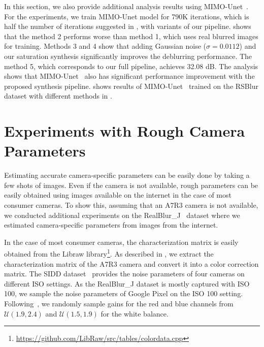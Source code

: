 In this section, we also provide additional analysis results using MIMO-Unet~\cite{Cho_2021_ICCV}. For the experiments, we train MIMO-Unet model for 790K iterations, which is half the number of iterations suggested in \cite{Cho_2021_ICCV}, with variants of our pipeline.
 shows that the method 2 performs worse than method 1, which uses real blurred images for training.
Methods 3 and 4 show that adding Gaussian noise ($\sigma=0.0112$) and our saturation synthesis significantly improves the deblurring performance.
The method 5, which corresponds to our full pipeline, achieves 32.08 dB.
The analysis shows that MIMO-Unet~\cite{Cho_2021_ICCV} also has significant performance improvement with the proposed synthesis pipeline.
 shows results of MIMO-Unet~\cite{Cho_2021_ICCV} trained on the RSBlur dataset with different methods in .

\section{Experiments with Rough Camera Parameters}

Estimating accurate camera-specific parameters can be easily done by taking a few shots of images.
Even if the camera is not available, rough parameters can be easily obtained using images available on the internet in the case of most consumer cameras.
To show this, assuming that an A7R3 camera is not available, we conducted additional experiments on the RealBlur\_J~\cite{jsrim-ECCV2020} dataset where we estimated camera-specific parameters from images from the internet.

In the case of most consumer cameras, the characterization matrix is easily obtained from the Libraw library\footnote{\href{https://github.com/LibRaw/LibRaw/blob/2a9a4de21ea7f5d15314da8ee5f27feebf239655/src/tables/colordata.cpp}{https://github.com/LibRaw/src/tables/colordata.cpp}}. As described in , we extract the characterization matrix of the A7R3 camera and convert it into a color correction matrix.
The SIDD dataset~\cite{Abdelhamed_2018_CVPR} provides the noise parameters of four cameras on different ISO settings. 
As the RealBlur\_J dataset is mostly captured with ISO 100, we sample the noise parameters of Google Pixel on the ISO 100 setting. 
Following~\cite{Brooks_2019_CVPR_denoising}, we randomly sample gains for the red and blue channels from $\mathcal{U}(1.9, 2.4)$ and $\mathcal{U}(1.5, 1.9)$ for the white balance.

